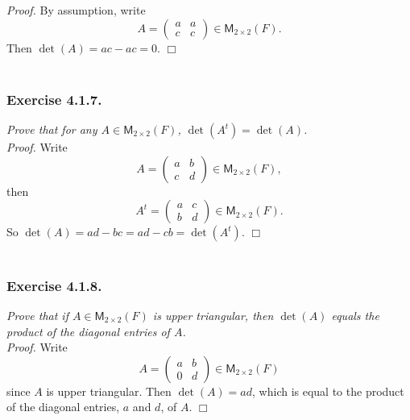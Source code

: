 \documentclass{article}
\begin{document}
\emph{Proof.}
By assumption, write
$$A =
\begin{pmatrix}
a & a \\
c & c
\end{pmatrix} \in \mathsf{M}_{2 \times 2}(F).$$
Then $\det(A) = ac - ac = 0$.
$\Box$ \\\\






\subsubsection*{Exercise 4.1.7.}
\emph{Prove that for any $A \in \mathsf{M}_{2 \times 2}(F)$,
$\det(A^t) = \det(A)$.} \\

\emph{Proof.}
Write
$$A =
\begin{pmatrix}
a & b \\
c & d
\end{pmatrix} \in \mathsf{M}_{2 \times 2}(F),$$
then
$$A^t =
\begin{pmatrix}
a & c \\
b & d
\end{pmatrix} \in \mathsf{M}_{2 \times 2}(F).$$
So $\det(A) = ad - bc = ad - cb = \det(A^t)$.
$\Box$ \\\\






\subsubsection*{Exercise 4.1.8.}
\emph{Prove that if $A \in \mathsf{M}_{2 \times 2}(F)$ is upper triangular,
then $\det(A)$ equals the product of the diagonal entries of $A$.} \\

\emph{Proof.}
Write
$$A =
\begin{pmatrix}
a & b \\
0 & d
\end{pmatrix} \in \mathsf{M}_{2 \times 2}(F)$$
since $A$ is upper triangular.
Then $\det(A) = ad$, which is equal to the product of the diagonal entries,
$a$ and $d$, of $A$.
$\Box$ \\\\
\end{document}
